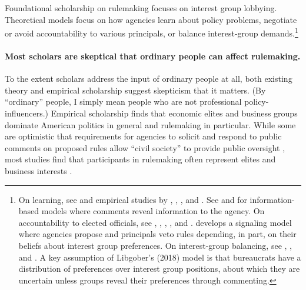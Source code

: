 \documentclass[
      12pt,
        ]{article}
\begin{document}
Foundational scholarship on rulemaking \citep[\citet{Furlong1997}, \citet{Furlong1998}, \citet{Kerwin2011}]{Furlong2005} focuses on interest group lobbying. Theoretical models focus on how agencies learn about policy problems, negotiate or avoid accountability to various principals, or balance interest-group demands.\footnote{On learning, see \citet{Kerwin2011} and empirical studies by \citet{Yackee2012},
  \citet{Cook2017}, \citet{Gordon2018}, and \citet{Walters2019}. See \citet{Gailmard2017} and
  \citet{Libgober2018} for information-based models where comments reveal information to the agency.
  On accountability to elected officials, see \citet{Furlong1997}, \citet{Nou2016},
  \citet{Potter2016}, \citet{Woods2018}, and \citet{Yackee2009RegGov}.
  \citet{Potter2014dis} develops a signaling model where agencies propose and principals veto rules depending, in part, on their beliefs about interest group preferences.
  On interest-group balancing, see \citet{Yackee2006JOP}, \citet{Yackee2006JPART},
  and \citet{Kerwin2011}. A key assumption of Libgober's (2018) model is that
  bureaucrats have a distribution of preferences over interest group
  positions, about which they are uncertain unless groups reveal their
  preferences through commenting.}

\hypertarget{most-scholars-are-skeptical-that-ordinary-people-can-affect-rulemaking.}{%
\paragraph{Most scholars are skeptical that ordinary people can affect rulemaking.}\label{most-scholars-are-skeptical-that-ordinary-people-can-affect-rulemaking.}}

To the extent scholars address the input of ordinary people at all, both
existing theory and empirical scholarship suggest skepticism that it
matters. (By ``ordinary'' people, I simply mean people who are not
professional policy-influencers.)
Empirical scholarship finds that economic elites and business groups
dominate American politics in general \citep{Gilens2014} and rulemaking in
particular. While some are optimistic that requirements for agencies to
solicit and respond to public comments on proposed rules allow ``civil
society'' to provide public oversight \citep{Michaels2015, Metzger2010}, most
studies find that participants in rulemaking often represent elites and
business interests \citep{Seifter2016UCLA, Crow2015, Wagner2011, West2009, Yackee2006JOP, Yackee2006JPART, Golden1998, Haeder2015, Cook2017}.
\end{document}
